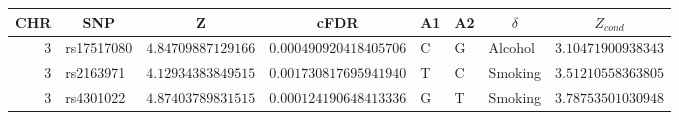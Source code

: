 \begin{tabular}{rlrrlllr}
\hline\hline
\multicolumn{1}{c}{CHR}&\multicolumn{1}{c}{SNP}&\multicolumn{1}{c}{Z}&\multicolumn{1}{c}{cFDR}&\multicolumn{1}{c}{A1}&\multicolumn{1}{c}{A2}&\multicolumn{1}{c}{$\delta$}&\multicolumn{1}{c}{$Z_{cond}$}\tabularnewline
\hline
$3$&rs17517080&$4.84709887129166$&$0.000490920418405706$&C&G&Alcohol&$3.10471900938343$\tabularnewline
$3$&rs2163971&$4.12934383849515$&$0.001730817695941940$&T&C&Smoking&$3.51210558363805$\tabularnewline
$3$&rs4301022&$4.87403789831515$&$0.000124190648413336$&G&T&Smoking&$3.78753501030948$\tabularnewline
\hline
\end{tabular}
